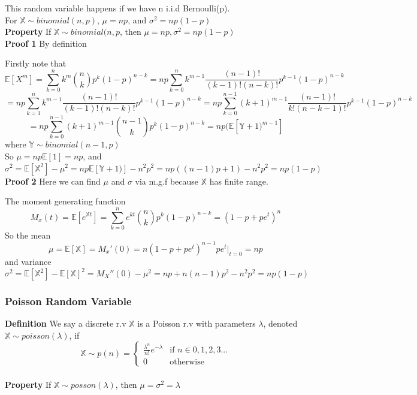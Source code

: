 \documentclass[a4paper,12pt]{article}
\begin{document}
This random variable happens if we have n i.i.d Bernoulli(p).\\

For $\mathbb{X} \sim binomial(n, p)$, $\mu = np$, and $\sigma^2 = np(1-p)$\\

\textbf{Property} If $\mathbb{X} \sim binomial(n, p$, then $\mu = np, \sigma^2 = np(1-p)$\\

\textbf{Proof 1} By definition

Firstly note that
$$\mathbb{E}[X^m] = \sum_{k=0}^n k^m {n \choose k}p^k(1-p)^{n-k} = np \sum_{k=0}^n k^{m-1} \frac{(n-1)!}{(k-1)!(n-k)!}p^{k-1}(1-p)^{n-k}$$
$$= np \sum_{k=1}^n k^{m-1} \frac{(n-1)!}{(k-1)!(n-k)!}p^{k-1}(1-p)^{n-k} = np \sum_{k=0}^{n-1} (k+1)^{m-1} \frac{(n-1)!}{k!(n-k-1)!}p^{k-1}(1-p)^{n-k}$$
$$= np \sum_{k=0}^{n-1} (k+1)^{m-1} {n-1 \choose k}p^k(1-p)^{n-k} = np(\mathbb{E}[\mathbb{Y}+1)^{m-1}]$$
where $\mathbb{Y} \sim binomial(n-1, p)$\\

So $\mu = np \mathbb{E}[1] = np$, and $\sigma^2 = \mathbb{E}[\mathbb{X}^2] - \mu^2 = np\mathbb{E}[\mathbb{Y}+1)] - n^2p^2 = np((n-1)p + 1) - n^2p^2 = np(1-p)$\\

\textbf{Proof 2}
Here we can find $\mu$ and $\sigma$ via m.g.f because $\mathbb{X}$ has finite range.

The moment generating function
$$M_x(t) = \mathbb{E}[e^{\mathbb{X}t}] = \sum_{k=0}^n e^{kt} {n \choose k}p^k(1-p)^{n-k} = (1-p+pe^t)^n$$
So the mean
$$ \mu = \mathbb{E}[\mathbb{X}] = M_x'(0) = n (1-p+pe^t)^{n-1} pe^t |_{t=0}= np$$
and variance
$$\sigma^2 = \mathbb{E}[\mathbb{X}^2] - \mathbb{E}[\mathbb{X}]^2 = M_X''(0) - \mu^2 = np + n(n-1)p^2 - n^2p^2 = np(1-p) $$ 

\subsubsection{Poisson Random Variable}
\textbf{Definition} We say a discrete r.v $\mathbb{X}$ is a Poisson r.v with parameters $\lambda$, denoted $\mathbb{X} \sim poisson(\lambda)$, if
$$
 \mathbb{X} \sim p(n) =
  \begin{cases}
   \frac{\lambda^n}{n!}e^{-\lambda} & \text{if } n \in 0, 1, 2, 3... \\
   0       & \text{otherwise}
  \end{cases}
$$\\

\textbf{Property} If $\mathbb{X} \sim posson(\lambda)$, then $\mu = \sigma^2 = \lambda$\\
\end{document}
